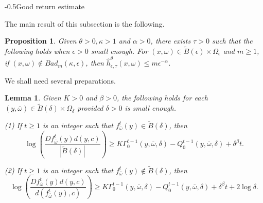 \documentclass[11pt,oneside]{article}
\makeatletter
\theoremstyle{plain}
\newtheorem{lem}{Lemma}[section]
\newtheorem{prop}{Proposition}
\numberwithin{equation}{section}
\numberwithin{figure}{section}
\numberwithin{table}{section}
\renewcommand{\subsection}{\@startsection{subsection}{1}{0mm}
{-\baselineskip}{0.5\baselineskip}{\large\bf\leftline}}
\makeatother
\begin{document}
\subsection{Good return estimate}


The main result of this subsection is the following.


\begin{prop}
Given $\theta > 0, \kappa > 1$ and $\alpha > 0$, there exists $\tau > 0$ such that the following holds when $\epsilon > 0$ small enough. For $(x, \omega) \in \tilde B(\epsilon) \times \Omega_{\epsilon}$ and $m \geq 1$, if $(x, \omega) \notin Bad_m(\kappa, \epsilon)$, then $\hat h_{\epsilon, \tau}^{\theta} (x, \omega) \leq m \epsilon^{-\alpha}$.
\end{prop}


We shall need several preparations.


\begin{lem}
Given $K>0$ and $\beta >0$, the following holds for each $(y, \overline \omega) \in \tilde B(\delta) \times \Omega_{\delta}$ provided $\delta> 0$ is small enough.

(1) If $t \geq 1$ is an integer such that $f_{\overline \omega}^t (y) \in \tilde B(\delta)$, then
\[
\log \left( \frac{Df_{\overline \omega}^t (y) d(y, c) }{|\tilde B(\delta)|} \right) \geq K \Gamma_0^{t-1}(y, \overline \omega, \delta) - Q_0^{t-1}(y, \overline \omega, \delta) + \delta^{\beta} t.
\]

(2) If $t \geq 1$ is an integer such that $f_{\overline \omega}^t (y) \notin \tilde B(\delta)$, then
\[
\log \left( \frac{Df_{\overline \omega}^t (y) d(y, c) }{d(f_{\overline \omega}^t (y), c)} \right) \geq K \Gamma_0^{t-1}(y, \overline \omega, \delta) - Q_0^{t-1}(y, \overline \omega, \delta) + \delta^{\beta} t + 2 \log \delta.
\]
\end{lem}
\end{document}
